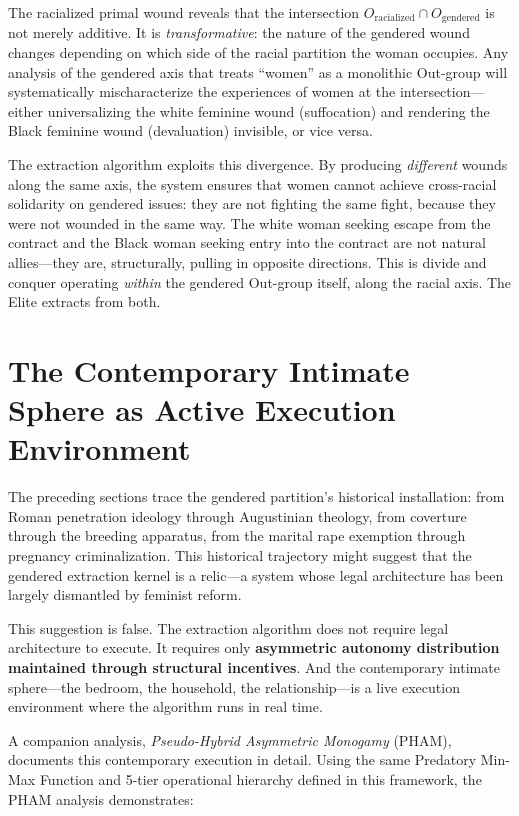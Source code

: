 \documentclass[12pt,openany]{book}
\begin{document}
The racialized primal wound reveals that the intersection $O_{\text{racialized}} \cap O_{\text{gendered}}$ is not merely additive. It is \textit{transformative}: the nature of the gendered wound changes depending on which side of the racial partition the woman occupies. Any analysis of the gendered axis that treats ``women'' as a monolithic Out-group will systematically mischaracterize the experiences of women at the intersection---either universalizing the white feminine wound (suffocation) and rendering the Black feminine wound (devaluation) invisible, or vice versa.

The extraction algorithm exploits this divergence. By producing \textit{different} wounds along the same axis, the system ensures that women cannot achieve cross-racial solidarity on gendered issues: they are not fighting the same fight, because they were not wounded in the same way. The white woman seeking escape from the contract and the Black woman seeking entry into the contract are not natural allies---they are, structurally, pulling in opposite directions. This is divide and conquer operating \textit{within} the gendered Out-group itself, along the racial axis. The Elite extracts from both.

\section{The Contemporary Intimate Sphere as Active Execution Environment}

The preceding sections trace the gendered partition's historical installation: from Roman penetration ideology through Augustinian theology, from coverture through the breeding apparatus, from the marital rape exemption through pregnancy criminalization. This historical trajectory might suggest that the gendered extraction kernel is a relic---a system whose legal architecture has been largely dismantled by feminist reform.

This suggestion is false. The extraction algorithm does not require legal architecture to execute. It requires only \textbf{asymmetric autonomy distribution maintained through structural incentives}. And the contemporary intimate sphere---the bedroom, the household, the relationship---is a live execution environment where the algorithm runs in real time.

A companion analysis, \textit{Pseudo-Hybrid Asymmetric Monogamy} (PHAM), documents this contemporary execution in detail. Using the same Predatory Min-Max Function and 5-tier operational hierarchy defined in this framework, the PHAM analysis demonstrates:
\end{document}
